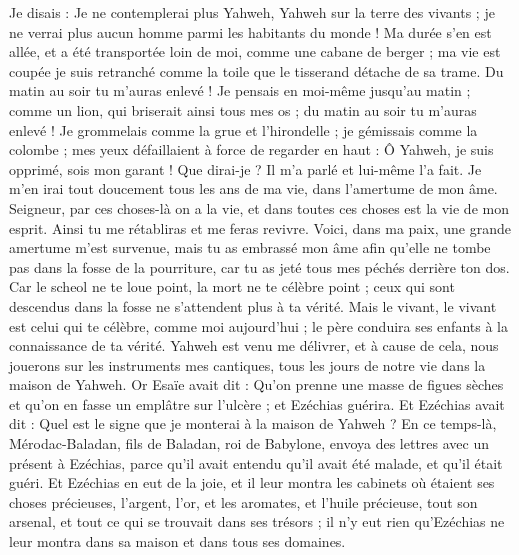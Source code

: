 \begin{multicols}{2}
Je disais : Je ne contemplerai plus Yahweh, Yahweh sur la terre des vivants ; je ne verrai plus aucun homme parmi les habitants du monde !
Ma durée s'en est allée, et a été transportée loin de moi, comme une cabane de berger ; ma vie est coupée je suis retranché comme la toile que le tisserand détache de sa trame. Du matin au soir tu m'auras enlevé !
Je pensais en moi-même jusqu'au matin ; comme un lion, qui briserait ainsi tous mes os ; du matin au soir tu m'auras enlevé !
Je grommelais comme la grue et l'hirondelle ; je gémissais comme la colombe ; mes yeux défaillaient à force de regarder en haut : Ô Yahweh, je suis opprimé, sois mon garant !
Que dirai-je ? Il m'a parlé et lui-même l'a fait. Je m'en irai tout doucement tous les ans de ma vie, dans l'amertume de mon âme.
Seigneur, par ces choses-là on a la vie, et dans toutes ces choses est la vie de mon esprit. Ainsi tu me rétabliras et me feras revivre.
Voici, dans ma paix, une grande amertume m'est survenue, mais tu as embrassé mon âme afin qu'elle ne tombe pas dans la fosse de la pourriture, car tu as jeté tous mes péchés derrière ton dos.
Car le scheol ne te loue point, la mort ne te célèbre point ; ceux qui sont descendus dans la fosse ne s'attendent plus à ta vérité.
Mais le vivant, le vivant est celui qui te célèbre, comme moi aujourd'hui ; le père conduira ses enfants à la connaissance de ta vérité.
Yahweh est venu me délivrer, et à cause de cela, nous jouerons sur les instruments mes cantiques, tous les jours de notre vie dans la maison de Yahweh.
Or Esaïe avait dit : Qu'on prenne une masse de figues sèches et qu'on en fasse un emplâtre sur l'ulcère ; et Ezéchias guérira.
Et Ezéchias avait dit : Quel est le signe que je monterai à la maison de Yahweh ?
\VerseOne{}En ce temps-là, Mérodac-Baladan, fils de Baladan, roi de Babylone, envoya des lettres avec un présent à Ezéchias, parce qu'il avait entendu qu'il avait été malade, et qu'il était guéri.
Et Ezéchias en eut de la joie, et il leur montra les cabinets où étaient ses choses précieuses, l'argent, l'or, et les aromates, et l'huile précieuse, tout son arsenal, et tout ce qui se trouvait dans ses trésors ; il n'y eut rien qu'Ezéchias ne leur montra dans sa maison et dans tous ses domaines.

\end{multicols}
